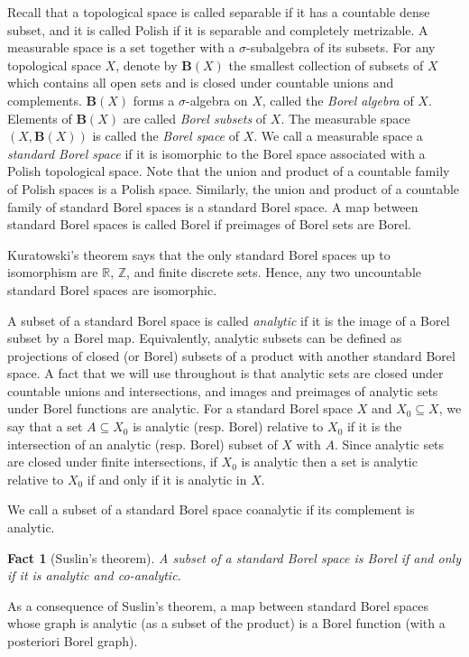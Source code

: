 \documentclass[12pt]{amsart}
\newtheorem{fact}[theorem]{Fact}
\begin{document}
Recall that a topological space is called separable if it has a countable dense subset, and it is called Polish if it is separable and completely metrizable. A measurable space is a set together with a $\sigma$-subalgebra of its subsets. For any topological space $X$, denote by $\mathbf{B}({X})$ the smallest collection of subsets of $X$ which contains all open sets and is closed under countable unions and complements. $\mathbf{B}({X})$ forms a $\sigma$-algebra on $X$, called the \textit{Borel algebra} of $X$. Elements of $\mathbf{B}({X})$ are called \textit{Borel subsets} of ${X}$. The measurable space $(X,\mathbf{B}({X}))$ is called the \textit{Borel space} of $X$. We call a measurable space a \textit{standard Borel space} if it is isomorphic to the Borel space associated with a Polish topological space. Note that the union and product of a countable family of Polish spaces is a Polish space. Similarly, the union and product of a countable family of standard Borel spaces is a standard Borel space. A map between standard Borel spaces is called Borel if preimages of Borel sets are Borel.

Kuratowski's theorem says that the only standard Borel spaces up to isomorphism are $\mathbb{R}$, $\mathbb{Z}$, and finite discrete sets. Hence, any two uncountable standard Borel spaces are isomorphic.

A subset of a standard Borel space is called \textit{analytic} if it is the image of a Borel subset by a Borel map.  
Equivalently, analytic subsets can be defined as projections of closed (or Borel) subsets of a product with another standard Borel space. A fact that we will use throughout is that analytic sets are closed under countable unions and intersections, and images and preimages of analytic sets under Borel functions are analytic. For a standard Borel space $X$ and $X_0\subseteq X$, we say that a set $A\subseteq X_0$ is analytic (resp. Borel) relative to $X_0$ if it is the intersection of an analytic (resp. Borel) subset of $X$ with $A$. Since analytic sets are closed under finite intersections, if $X_0$ is analytic then a set is analytic relative to $X_0$ if and only if it is analytic in $X$. 

We call a subset of a standard Borel space coanalytic if its complement is analytic. 
\begin{fact}[Suslin's theorem] \label{fact: suslin's thm}
    A subset of a standard Borel space is Borel if and only if it is analytic and co-analytic.
\end{fact}
As a consequence of Suslin's theorem, a map between standard Borel spaces whose graph is analytic (as a subset of the product) is a Borel function (with a posteriori Borel graph).  
\end{document}
